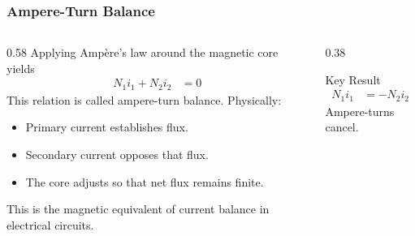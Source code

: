 \begin{frame}
    \frametitle{Ampere-Turn Balance}
    \begin{columns}
        \begin{column}{0.58\textwidth}
            Applying Amp\`ere's law around the magnetic core yields
            \begin{align}
                N_1 i_1 + N_2 i_2 &= 0
            \end{align}
            This relation is called ampere-turn balance.
            \vspace{0.15cm}
            Physically:
            \begin{itemize}
                \item Primary current establishes flux.
                \item Secondary current opposes that flux.
                \item The core adjusts so that net flux remains finite.
            \end{itemize}
            \vspace{0.15cm}
            This is the magnetic equivalent of current balance in electrical circuits.
        \end{column}
        \begin{column}{0.38\textwidth}
            \begin{block}{Key Result}
                \begin{align}
                    N_1 i_1 &= -N_2 i_2
                \end{align}
                Ampere-turns cancel.
            \end{block}
        \end{column}
    \end{columns}
\end{frame}


